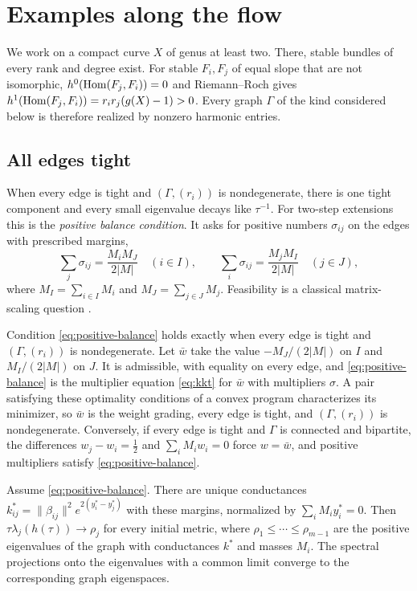 \section{Examples along the flow}\label{sec:flow-examples}

We work on a compact curve $X$ of genus at least two. There, stable bundles
of every rank and degree exist. For stable $F_i,F_j$ of equal slope that are
not isomorphic, $h^0(\operatorname{Hom}(F_j,F_i))=0$ and Riemann--Roch gives
$h^1(\operatorname{Hom}(F_j,F_i))=r_ir_j(g(X)-1)>0$. Every graph $\Gamma$ of the kind
considered below is therefore realized by nonzero harmonic entries.

\subsection{All edges tight}

When every edge is tight and $(\Gamma,(r_i))$ is nondegenerate, there is one tight
component and every small eigenvalue decays like $\tau^{-1}$. For two-step
extensions this is the \emph{positive balance condition}. It asks for
positive numbers $\sigma_{ij}$ on the edges with prescribed margins,
\begin{equation}\label{eq:positive-balance}
 \sum_j\sigma_{ij}=\frac{M_iM_J}{2|M|}\quad(i\in I),\qquad
 \sum_i\sigma_{ij}=\frac{M_jM_I}{2|M|}\quad(j\in J),
\end{equation}
where $M_I=\sum_{i\in I}M_i$ and $M_J=\sum_{j\in J}M_j$. Feasibility is a
classical matrix-scaling question \cite{SinkhornKnopp1967,RothblumSchneider1989}.

Condition \eqref{eq:positive-balance} holds exactly when every edge is tight
and $(\Gamma,(r_i))$ is nondegenerate. Let $\bar w$ take the value $-M_J/(2|M|)$ on
$I$ and $M_I/(2|M|)$ on $J$. It is admissible, with equality on every edge,
and \eqref{eq:positive-balance} is the multiplier equation \eqref{eq:kkt}
for $\bar w$ with multipliers $\sigma$. A pair satisfying these optimality
conditions of a convex program characterizes its minimizer, so $\bar w$ is the
weight grading, every edge is tight, and $(\Gamma,(r_i))$ is nondegenerate.
Conversely, if every edge is tight and $\Gamma$ is connected and bipartite, the
differences $w_j-w_i=\frac12$ and $\sum_iM_iw_i=0$ force $w=\bar w$, and
positive multipliers satisfy \eqref{eq:positive-balance}.

\begin{corollary}\label{cor:balanced}
Assume \eqref{eq:positive-balance}. There are unique conductances
$k^*_{ij}=\lVert\beta_{ij}\rVert^2e^{2(y^*_i-y^*_j)}$ with these margins,
normalized by $\sum_iM_iy^*_i=0$. Then
$\tau\lambda_j(h(\tau))\to\rho_j$ for every initial metric, where
$\rho_1\le\cdots\le\rho_{m-1}$ are the positive eigenvalues of the graph
with conductances $k^*$ and masses $M_i$. The spectral projections onto the
eigenvalues with a common limit converge to the
corresponding graph eigenspaces.
\end{corollary}

